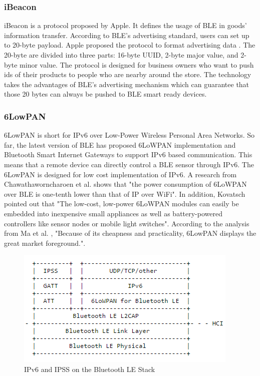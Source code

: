 \documentclass{Nan_Thesis}
\begin{document}
\subsubsection{iBeacon} 
iBeacon is a protocol proposed by Apple. It defines the usage of BLE in goods’ information transfer. According to BLE’s advertising standard, users can set up to 20-byte payload. Apple proposed the protocol to format advertising data \cite{iOS2014ibeacon}. The 20-byte are divided into three parts: 16-byte UUID, 2-byte major value, and 2-byte minor value. The protocol is designed for business owners who want to push ids of their products to people who are nearby around the store. The technology takes the advantages of BLE’s advertising mechanism which can guarantee that those 20 bytes can always be pushed to BLE smart ready devices. 
\subsubsection{6LowPAN}
6LowPAN is short for IPv6 over Low-Power Wireless Personal Area Networks. So far, the latest version of BLE \cite{SIG2014bluetooth4.2faq} has proposed 6LoWPAN implementation and Bluetooth Smart Internet Gateways to support IPv6 based communication. This means that a remote device can directly control a BLE sensor through IPv6. The 6LowPAN is designed for low cost implementation of IPv6. A research from Chawathaworncharoen et al. \cite{chawathaworncharoen2015feasibility} shows that "the power consumption of 6LoWPAN over BLE is one-tenth lower than that of IP over WiFi". In addition, Kovatsch \cite{kovatsch2010embedding} pointed out that "The low-cost, low-power 6LoWPAN modules can easily be embedded into inexpensive small appliances as well as battery-powered controllers like sensor nodes or mobile light switches". According to the analysis from Ma et al. \cite{ma2008analysis}, "Because of its cheapness and practicality, 6LowPAN displays the great market foreground.".

\begin{figure}[h]
  \centering 
      \includegraphics[scale=1]{pic/ble6lowpansolution.png} 
  \caption{IPv6 and IPSS on the Bluetooth LE Stack \cite{nieminen2015ipv6}}
\end{figure} 
\end{document}
